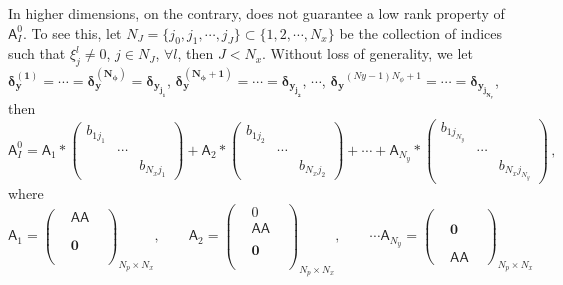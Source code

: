 \documentclass[english,reqno]{amsart}
\theoremstyle{plain}
\theoremstyle{definition} %
\renewcommand{\vec}[1]{\mathbf{#1}}
\newcommand{\Amat}{\mathsf{A}}
\newcommand{\AAmat}{\mathsf{AA}}
\begin{document}
In higher dimensions, on the contrary, does not guarantee a low rank property of $\Amat_I^0$. To see this, let $N_J = \{j_0, j_1, \cdots, j_J\} \subset \{ 1, 2, \cdots, N_x \}$ be the collection of indices such that $\xi_j^{l} \neq 0$, $j \in N_J$, $\forall l $, then $J< N_x$. Without loss of generality, we let $\vec{\delta_{y}^{(1)}}= \cdots =  \vec{\delta_{y}^{(N_\phi)}} = \vec{\delta_{y_{j_1}}}$, $\vec{\delta_{y}^{(N_\phi+1)}} = \cdots =  \vec{\delta_{y_{j_2}}}$, $\cdots$, $\vec{\delta_{y}}^{(Ny-1)N_\phi+1} = \cdots = \vec{\delta_{y_{j_{N_y}}}}$, then
\begin{equation*}
\Amat_I^0 =    \Amat_1 * \left( \begin{array}{ccc} b_{1j_1} & & \\ & \cdots & \\ & & b_{N_x j_1}  \end{array}\right) + 
\Amat_2 * \left( \begin{array}{ccc} b_{1j_2} & & \\ & \cdots & \\ & & b_{N_x j_2}  \end{array}\right) + 
\cdots + 
\Amat_{N_y} * \left( \begin{array}{ccc} b_{1j_{N_y}} & & \\ & \cdots & \\ & & b_{N_x j_{N_y}}  \end{array}\right)
\,,
\end{equation*}
where
\begin{equation*}
\Amat_1 = \left( \begin{array}{ccc}
& \AAmat & 
\\ & &
\\ & & 
\\ & \vec{0} & 
\\ & & 
\\ & & 
\end{array}
\right)_{N_p \times N_x}, \qquad
\Amat_2 = \left( \begin{array}{ccc}
& 0 & 
\\ & \AAmat & 
\\ & & 
\\ & \vec{0} & 
\\ & & 
\\ & & 
\end{array}
\right)_{N_p \times N_x}, \qquad  \cdots
\Amat_{N_y} = \left( \begin{array}{ccc}
&  & 
\\ && 
\\ &\vec{0} & 
\\ &  & 
\\ & & 
\\ & \AAmat & 
\end{array}
\right)_{N_p \times N_x}
\end{equation*}
\end{document}

